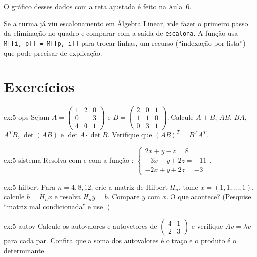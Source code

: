 O gráfico desses dados com a reta ajustada é feito na Aula~6.

\begin{professor}
Se a turma já viu escalonamento em Álgebra Linear, vale fazer o primeiro passo da eliminação no quadro e comparar
com a saída de \texttt{escalona}. A função usa \texttt{M[[i, p]] = M[[p, i]]} para trocar linhas, um recurso
(``indexação por lista'') que pode precisar de explicação.
\end{professor}

\section{Exercícios}

\begin{exercicio}[operações]{ex:5-ops}
Sejam $A=\begin{pmatrix}1&2&0\\0&1&3\\4&0&1\end{pmatrix}$ e $B=\begin{pmatrix}2&0&1\\1&1&0\\0&3&1\end{pmatrix}$.
Calcule $A+B$, $AB$, $BA$, $A^TB$, $\det(AB)$ e $\det A\cdot\det B$. Verifique que $(AB)^T=B^TA^T$.
\end{exercicio}

\begin{exercicio}[sistema]{ex:5-sistema}
Resolva com  e com a função :
$\begin{cases}2x+y-z=8\\-3x-y+2z=-11\\-2x+y+2z=-3\end{cases}$.
\end{exercicio}

\begin{exercicio}{ex:5-hilbert}
Para $n=4, 8, 12$, crie a matriz de Hilbert $H_n$, tome $x=(1,1,\dots,1)$, calcule $b=H_nx$ e resolva $H_ny=b$.
Compare $y$ com $x$. O que acontece? (Pesquise ``matriz mal condicionada'' e use .)
\end{exercicio}

\begin{exercicio}[autovalores]{ex:5-autov}
Calcule os autovalores e autovetores de $\begin{pmatrix}4&1\\2&3\end{pmatrix}$ e verifique $Av=\lambda v$ para cada par.
Confira que a soma dos autovalores é o traço e o produto é o determinante.
\end{exercicio}

